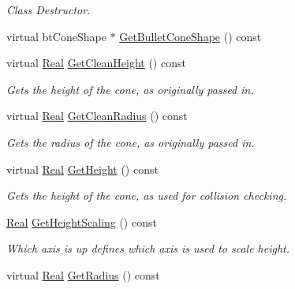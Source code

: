 \begin{DoxyCompactItemize}
\begin{DoxyCompactList}\small\item\em Class Destructor. \item\end{DoxyCompactList}\item 
virtual btConeShape $\ast$ \hyperlink{classMezzanine_1_1ConeCollisionShape_aff8623fa14d66fce32738ff075c1cc7c}{GetBulletConeShape} () const 
\item 
virtual \hyperlink{namespaceMezzanine_a726731b1a7df72bf3583e4a97282c6f6}{Real} \hyperlink{classMezzanine_1_1ConeCollisionShape_af52995ed04491df5ebbff26af6ecd816}{GetCleanHeight} () const 
\begin{DoxyCompactList}\small\item\em Gets the height of the cone, as originally passed in. \item\end{DoxyCompactList}\item 
virtual \hyperlink{namespaceMezzanine_a726731b1a7df72bf3583e4a97282c6f6}{Real} \hyperlink{classMezzanine_1_1ConeCollisionShape_a24b59bbca0455e54cf7bb692ff46c080}{GetCleanRadius} () const 
\begin{DoxyCompactList}\small\item\em Gets the radius of the cone, as originally passed in. \item\end{DoxyCompactList}\item 
virtual \hyperlink{namespaceMezzanine_a726731b1a7df72bf3583e4a97282c6f6}{Real} \hyperlink{classMezzanine_1_1ConeCollisionShape_a6247f2a72e298ada975a0fa840b12629}{GetHeight} () const 
\begin{DoxyCompactList}\small\item\em Gets the height of the cone, as used for collision checking. \item\end{DoxyCompactList}\item 
\hyperlink{namespaceMezzanine_a726731b1a7df72bf3583e4a97282c6f6}{Real} \hyperlink{classMezzanine_1_1ConeCollisionShape_aa3c48e845cb96783118d2cb9562246a9}{GetHeightScaling} () const 
\begin{DoxyCompactList}\small\item\em Which axis is up defines which axis is used to scale height. \item\end{DoxyCompactList}\item 
virtual \hyperlink{namespaceMezzanine_a726731b1a7df72bf3583e4a97282c6f6}{Real} \hyperlink{classMezzanine_1_1ConeCollisionShape_ae2d8ed139802999b4bec4fdac4814ef3}{GetRadius} () const 

\end{DoxyCompactItemize}
